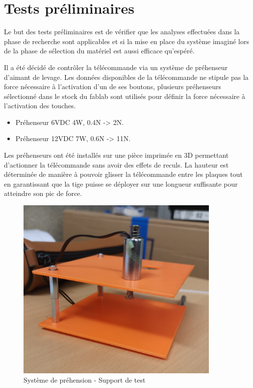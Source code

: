 \section{Tests préliminaires}
Le but des tests préliminaires est de vérifier que les analyses effectuées dans la phase de recherche sont applicables et si la mise en
place du système imaginé lors de la phase de sélection du matériel est aussi efficace qu'espéré.

Il a été décidé de contrôler la télécommande via un système de préhenseur d'aimant de levage. Les données disponibles de la télécommande
ne stipule pas la force nécessaire à l'activation d'un de ses boutons, plusieurs préhenseurs sélectionné dans le stock du \Gls{fablab}
sont utilisés pour définir la force nécessaire à l'activation des touches.

\begin{itemize}
    \item Préhenseur 6VDC 4W, 0.4N -> 2N.
    \item Préhenseur 12VDC 7W, 0.6N -> 11N.
\end{itemize}

Les préhenseurs ont été installés sur une pièce imprimée en 3D permettant d'actionner la télécommande sans avoir des effets de reculs.
La hauteur est déterminée de manière à pouvoir glisser la télécommande entre les plaques tout en garantissant que la tige puisse se déployer sur
une longueur suffisante pour atteindre son pic de force.

\begin{figure}[H]
    \centering
    \includegraphics[width=10cm]{assets/figures/support_test_prehenseur.jpg}
    \caption{Système de préhension - Support de test}
\end{figure}

